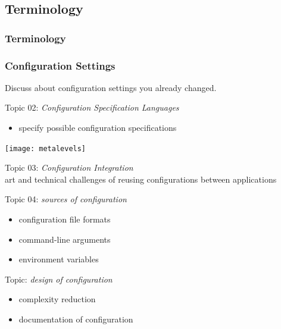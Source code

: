 \subsection{Terminology}
\begin{frame}
	\frametitle{Terminology}
	
\end{frame}

\begin{assignment}
	\frametitle{Configuration Settings}
	\begin{task}
	Discuss about configuration settings you already changed.
	\end{task}
\end{assignment}

\begin{frame}
	Topic 02: \textit{Configuration Specification Languages}
	\begin{itemize}
		\item specify possible configuration specifications
	\end{itemize}
	\vspace{0.5cm}
	\texttt{[image: metalevels]}
\end{frame}

\begin{frame}
	Topic 03: \textit{Configuration Integration}
	\\ \vspace{1cm}
	art and technical challenges of reusing configurations between applications
\end{frame}


\begin{frame}
	Topic 04: \textit{sources of configuration}
	\begin{itemize}
		\item configuration file formats
		\item command-line arguments
		\item environment variables
	\end{itemize}
\end{frame}

\begin{frame}
	Topic: \textit{design of configuration}
	\begin{itemize}
		\item complexity reduction
		\item documentation of configuration
	\end{itemize}
\end{frame}

